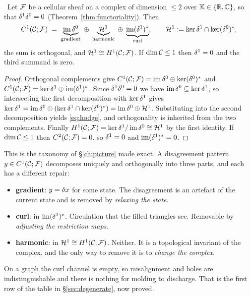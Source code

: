 \begin{theorem}\label{thm:hodge}
\Proved\ Let $\mathcal{F}$ be a cellular sheaf on a complex of dimension $\le2$ over
$\mathbb{K}\in\{\mathbb{R},\mathbb{C}\}$, so that $\delta^1\delta^0=0$
(Theorem~\ref{thm:functoriality}). Then
\begin{equation}\label{eq:hodge}
  C^{1}(\mathcal{C};\mathcal{F}) \;=\; \underbrace{\operatorname{im}\delta^0}_{\text{gradient}}
        \;\oplus\; \underbrace{\mathcal{H}^1}_{\text{harmonic}}
        \;\oplus\; \underbrace{\operatorname{im}(\delta^1)^{\ast}}_{\text{curl}},
  \qquad
  \mathcal{H}^1:=\ker\delta^1\cap\ker(\delta^0)^{\ast},
\end{equation}
the sum is orthogonal, and $\mathcal{H}^1\cong H^{1}(\mathcal{C};\mathcal{F})$. If $\dim\mathcal{C}\le1$ then
$\delta^1=0$ and the third summand is zero.
\end{theorem}
\begin{proof}
Orthogonal complements give $C^{1}(\mathcal{C};\mathcal{F})=\operatorname{im}\delta^0\oplus\ker(\delta^0)^{\ast}$ and
$C^{1}(\mathcal{C};\mathcal{F})=\ker\delta^1\oplus\operatorname{im}(\delta^1)^{\ast}$. Since $\delta^1\delta^0=0$ we have
$\operatorname{im}\delta^0\subseteq\ker\delta^1$, so intersecting the first decomposition with
$\ker\delta^1$ gives
$\ker\delta^1=\operatorname{im}\delta^0\oplus(\ker\delta^1\cap\ker(\delta^0)^{\ast})
=\operatorname{im}\delta^0\oplus\mathcal{H}^1$. Substituting into the second decomposition yields
\eqref{eq:hodge}, and orthogonality is inherited from the two complements.
Finally $H^{1}(\mathcal{C};\mathcal{F})=\ker\delta^1/\operatorname{im}\delta^0\cong\mathcal{H}^1$ by the first identity. If
$\dim\mathcal{C}\le1$ then $C^{2}(\mathcal{C};\mathcal{F})=0$, so $\delta^1=0$ and $\operatorname{im}(\delta^1)^{\ast}=0$.
\end{proof}

\begin{intu}\Intu
This is the taxonomy of \S\ref{ch:picture} made exact. A disagreement pattern
$y\in C^{1}(\mathcal{C};\mathcal{F})$ decomposes uniquely and orthogonally into three parts, and each
has a different repair:
\begin{itemize}
  \item \textbf{gradient}: $y=\delta x$ for some state. The disagreement is an
    artefact of the current state and is removed by \emph{relaxing the state}.
  \item \textbf{curl}: in $\operatorname{im}(\delta^1)^{\ast}$. Circulation that the filled
    triangles see. Removable by \emph{adjusting the restriction maps}.
  \item \textbf{harmonic}: in $\mathcal{H}^1\cong H^{1}(\mathcal{C};\mathcal{F})$. Neither. It is a
    topological invariant of the complex, and the only way to remove it is to
    \emph{change the complex}.
\end{itemize}
On a graph the curl channel is empty, so misalignment and holes are
indistinguishable and there is nothing for molding to discharge. That is the
first row of the table in \S\ref{sec:degenerate}, now proved.
\end{intu}

